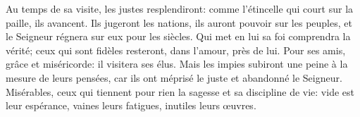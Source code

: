 Au temps de sa visite, les justes resplendiront:
	comme l’étincelle qui court sur la paille, ils avancent.
Ils jugeront les nations, ils auront pouvoir sur les peuples,
	et le Seigneur régnera sur eux pour les siècles.
Qui met en lui sa foi comprendra la vérité;
	ceux qui sont fidèles resteront, dans l’amour, près de lui.
Pour ses amis, grâce et miséricorde:
	il visitera ses élus.
Mais les impies subiront une peine à la mesure de leurs pensées,
	car ils ont méprisé le juste et abandonné le Seigneur.
Misérables, ceux qui tiennent pour rien la sagesse et sa discipline de vie:
	vide est leur espérance, vaines leurs fatigues, inutiles leurs œuvres.
